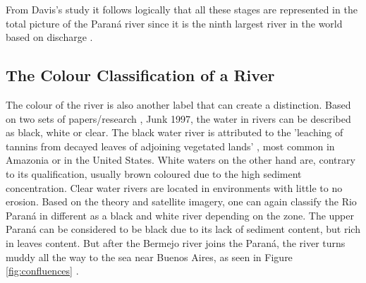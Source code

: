 From Davis's study it follows logically that all these stages are represented in the total picture of the Paraná river since it is the ninth largest river in the world based on discharge \autocite{lopezweibelSourcesTemporalDynamics2022}.

\subsection{The Colour Classification of a River}
The colour of the river is also another label that can create a distinction. Based on two sets of papers/research  \autocite{furchWaterChemistryAmazon1984}, \autocite{sioliAmazonLimnologyLandscape1984}  Junk 1997, the water in rivers can be described as black, white or clear. The black water river is attributed to the 'leaching of tannins from decayed leaves of adjoining vegetated lands' \autocite{sand-mining-boek}, most common in Amazonia or in the United States. White waters on the other hand are, contrary to its qualification, usually brown coloured due to the high sediment concentration. Clear water rivers are located in environments with little to no erosion.
Based on the theory and satellite imagery, one can again classify the Rio Paraná in different as a black and white river depending on the zone. The upper Paraná can be considered to be black due to its lack of sediment content, but rich in leaves content. But after the Bermejo river joins the Paraná, the river turns muddy all the way to the sea near Buenos Aires, as seen in Figure \ref{fig:confluences} \autocite{lopezweibelSourcesTemporalDynamics2022}.

